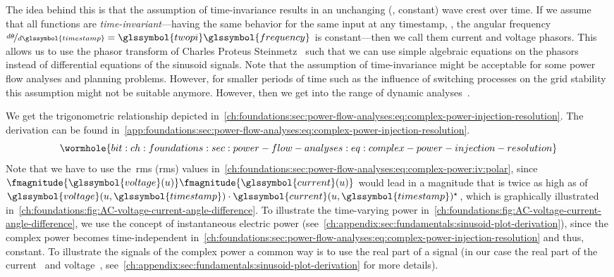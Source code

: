 % 
The idea behind this is that the assumption of time-invariance results in an
unchanging (\ie, constant) wave crest over time.
% 
If we assume that all functions are \emph{time-invariant}---having the same
behavior for the same input at any timestamp, \ie, the angular
frequency~$\nicefrac{d\aangle}{d\glssymbol{timestamp}} = \glssymbol{twopi}
\glssymbol{frequency}$ is constant---then we call them current and voltage
phasors. This allows us to use the phasor transform of Charles Proteus
Steinmetz~\parencite{Yan08,Rob12} such that we can use simple algebraic
equations on the phasors instead of differential equations of the sinusoid
signals. Note that the assumption of time-invariance might be acceptable for
some power flow analyses and planning problems. However, for smaller periods of
time such as the influence of switching processes on the grid stability this
assumption might not be suitable anymore. However, then we get into the range of
dynamic analyses~\parencite{Str18,Roh12,Tim14,Tim18}.

% 
We get the trigonometric relationship depicted
in~\cref{ch:foundations:sec:power-flow-analyses:eq:complex-power-injection-resolution}.
The derivation can be found
in~\cref{app:foundations:sec:power-flow-analyses:eq:complex-power-injection-resolution}.
%
\begin{subequations}
    \wormhole{bit:ch:foundations:sec:power-flow-analyses:eq:complex-power-injection-resolution} 
    
    \label{ch:foundations:sec:power-flow-analyses:eq:complex-power-injection-resolution}
\end{subequations}
% 
Note that we have to use the~\acrlong{rms} (\gls{rms}) values
in~\cref{ch:foundations:sec:power-flow-analyses:eq:complex-power:iv:polar},
since $\fmagnitude{\glssymbol{voltage}(\vertexa)}\fmagnitude{\glssymbol{current}
(\vertexa)}$ would lead in a magnitude that is twice as high as of~$
\glssymbol{voltage}(\vertexa,\glssymbol{timestamp})\cdot\glssymbol{current}
(\vertexa,\glssymbol{timestamp})^\star$, which is graphically illustrated in~\cref{ch:foundations:fig:AC-voltage-current-angle-difference}. 
% 
To illustrate the time-varying power
in~\cref{ch:foundations:fig:AC-voltage-current-angle-difference}, we use the
concept of instantaneous electric power
(see~\cref{ch:appendix:sec:fundamentals:sinusoid-plot-derivation}), since the
complex power becomes time-independent
in~\cref{ch:foundations:sec:power-flow-analyses:eq:complex-power-injection-resolution}
and thus, constant. To illustrate the signals of the complex power a common way
is to use the real part of a signal (in our case the real part of the
current~ and voltage~,
see~\cref{ch:appendix:sec:fundamentals:sinusoid-plot-derivation} for more
details).

